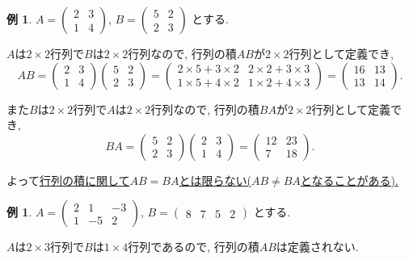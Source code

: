\documentclass[dvipdfmx,a4paper,11pt]{article}
\theoremstyle{definition}
\newtheorem{exa}[thm]{例}
\begin{document}
 \begin{exa}
 $ A= 
 \begin{pmatrix}
2 & 3\\
1 & 4
 \end{pmatrix}
 $, $
 B = 
 \begin{pmatrix}
5 & 2\\
2 & 3
 \end{pmatrix}
 $
 とする. 
 
 $A$は$2\times 2$行列で$B$は$2 \times 2$行列なので, 行列の積$AB$が$2 \times 2$行列として定義でき, 
 $$
 AB = 
 \begin{pmatrix}
2 & 3\\
1 & 4
 \end{pmatrix}
 \begin{pmatrix}
5 & 2\\
2 & 3
 \end{pmatrix}
 =  
 \begin{pmatrix}
2 \times 5 + 3 \times 2& 2 \times 2 + 3 \times 3\\
1 \times 5 + 4 \times 2 & 1\times 2 + 4 \times 3
 \end{pmatrix}
 = 
 \begin{pmatrix}
16 & 13\\
13 & 14
 \end{pmatrix}.
 $$
 
また$B$は$2\times 2$行列で$A$は$2 \times 2$行列なので, 行列の積$BA$が$2 \times 2$行列として定義でき, 
 $$
 BA = 
  \begin{pmatrix}
5 & 2\\
2 & 3
 \end{pmatrix}
  \begin{pmatrix}
2 & 3\\
1 & 4
 \end{pmatrix}
 =
  \begin{pmatrix}
12 & 23\\
7 & 18
 \end{pmatrix}.
 $$

よって\underline{行列の積に関して$AB=BA$とは限らない($AB \neq BA$となることがある).}
 \end{exa}
 
  \begin{exa}
 $ A= 
 \begin{pmatrix}
2 & 1&-3\\
1 & -5 & 2
 \end{pmatrix}
 $, $
 B = 
  \begin{pmatrix}
8 & 7&5 & 2
 \end{pmatrix}
 $
 とする. 
 
 $A$は$2 \times 3$行列で$B$は$1 \times 4$行列であるので, 行列の積$AB$は定義されない.
 \end{exa}
 
\end{document}
